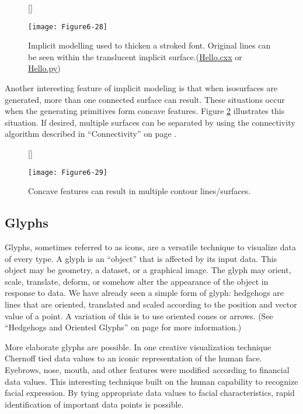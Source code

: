 \begin{figure}[!htb]
	[\FBwidth]
	{\caption{Implicit modelling used to thicken a stroked font. Original lines can be seen within the translucent implicit surface.(\href{https://lorensen.github.io/VTKExamples/site/Cxx/VisualizationAlgorithms/Hello/}{Hello.cxx} or \href{https://lorensen.github.io/VTKExamples/site/Python/VisualizationAlgorithms/Hello/}{Hello.py})}\label{fig:Figure6-28}}
	{\texttt{[image: Figure6-28]}}
\end{figure}

Another interesting feature of implicit modeling is that when isosurfaces are generated, more than one connected surface can result. These situations occur when the generating primitives form concave features. Figure \ref{fig:Figure6-29} illustrates this situation. If desired, multiple surfaces can be separated by using the connectivity algorithm described in ``Connectivity'' on page \pageref{subsec:connectivity}.

\begin{figure}[!htb]
	[\FBwidth]
	{\caption{Concave features can result in multiple contour lines/surfaces.}\label{fig:Figure6-29}}
	{\texttt{[image: Figure6-29]}}
\end{figure}

\subsection{Glyphs}
\label{subsec:glyphs}

Glyphs, sometimes referred to as icons, are a versatile technique to visualize data of every type. A glyph is an ``object'' that is affected by its input data. This object may be geometry, a dataset, or a graphical image. The glyph may orient, scale, translate, deform, or somehow alter the appearance of the object in response to data. We have already seen a simple form of glyph: hedgehogs are lines that are oriented, translated and scaled according to the position and vector value of a point. A variation of this is to use oriented cones or arrows. (See ``Hedgehogs and Oriented Glyphs'' on page \pageref{subsec:hedgehogs_oriented_glyphs} for more information.)

More elaborate glyphs are possible. In one creative visualization technique Chernoff \cite{Chernoff73} tied data values to an iconic representation of the human face. Eyebrows, nose, mouth, and other features were modified according to financial data values. This interesting technique built on the human capability to recognize facial expression. By tying appropriate data values to facial characteristics, rapid identification of important data points is possible.

